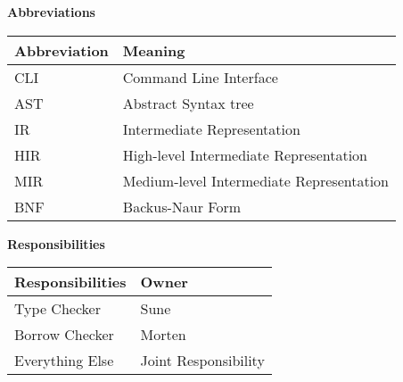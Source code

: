 \textbf{Abbreviations}
\begin{table}[H]
  \label{tab:}
  \begin{tabular}{|p{5cm}|p{5cm}|}
    \hline
    Abbreviation & Meaning\\
    \hline
    CLI & Command Line Interface\\
    \hline
    AST & Abstract Syntax tree\\
    \hline
    IR & Intermediate Representation\\
    \hline
    HIR & High-level Intermediate Representation \\
    \hline
    MIR & Medium-level Intermediate Representation \\
    \hline
    BNF & Backus-Naur Form \\
    \hline
  \end{tabular}
\end{table}

\textbf{Responsibilities}
\begin{table}[H]
  \label{tab:}
  \begin{tabular}{|p{5cm}|p{5cm}|}
    \hline
    Responsibilities & Owner \\
    \hline
    Type Checker & Sune\\
    \hline
    Borrow Checker & Morten\\
    \hline
    Everything Else & Joint Responsibility\\
    \hline
  \end{tabular}
\end{table}



\newpage

